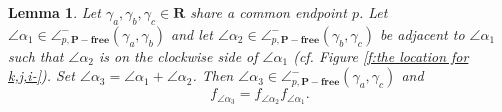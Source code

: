 \documentclass[a4paper,10pt]{amsart}
\theoremstyle{plain}          %
\newtheorem{lemma}[theorem]{Lemma}
\theoremstyle{definition}
\newcommand{\appfree}{\angle^-_{p,\mathbf{P-free}}}
\begin{document}
\begin{lemma}\label{l:f_alpha_3 can be factored}
Let $\gamma_a,\gamma_b,\gamma_c\in\mathbf{R}$ share a common endpoint $p$.
    Let $\angle\alpha_1\in\appfree(\gamma_a,\gamma_b)$ and let $\angle\alpha_2\in\appfree(\gamma_b,\gamma_c)$ be adjacent to $\angle\alpha_1$ such that  $\angle\alpha_2$ is on the clockwise side of $\angle\alpha_1$ (cf. Figure \ref{f:the location for k,j,i-}).
     Set $\angle \alpha_3=\angle\alpha_1+\angle\alpha_2$. Then $\angle\alpha_3\in \appfree(\gamma_a,\gamma_c)$ and $$f_{\angle\alpha_3}=f_{\angle\alpha_2}f_{\angle\alpha_1}.$$
\end{lemma}     
\end{document}
